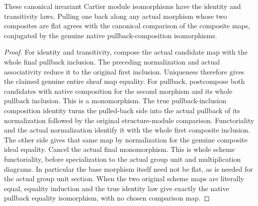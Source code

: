 \begin{lemma}
\label{lem:cartier-invariant-module-coherence}
\leanok
{}
These canonical invariant Cartier module isomorphisms have the identity
and transitivity laws. Pulling one back along any actual morphism whose two composites are flat
agrees with the canonical comparison of the composite maps, conjugated
by the genuine native pullback-composition isomorphisms.
\end{lemma}
\begin{proof}
For identity and transitivity, compose the actual candidate map with the
whole final pullback inclusion. The preceding normalization and actual
associativity reduce it to the original first inclusion. Uniqueness
therefore gives the claimed genuine entire sheaf map equality. For
pullback, postcompose both candidates with native composition for the
second morphism and its whole pullback inclusion. This is a monomorphism.
The true pullback-inclusion composition identity turns the pulled-back
side into the actual pullback of its normalization followed by the
original structure-module comparison. Functoriality and the actual
normalization identify it with the whole first composite inclusion.
The other side gives that same map by normalization for the genuine
composite ideal equality. Cancel the actual final monomorphism. This is
whole scheme functoriality, before specialization to the actual group
unit and multiplication diagrams. In particular the base morphism itself
need not be flat, as is needed for the actual group unit section. When
the two original scheme maps are literally equal, equality induction and
the true identity law give exactly the native pullback equality
isomorphism, with no chosen comparison map.
\end{proof}
